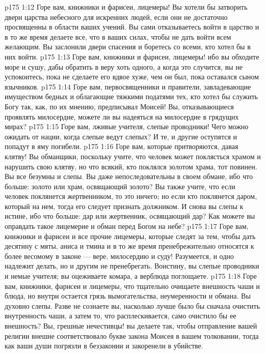 \vs p175 1:12 Горе вам, книжники и фарисеи, лицемеры! Вы хотели бы затворить двери царства небесного для искренних людей, если они не достаточно просвященны в области ваших учений. Вы сами отказываетесь войти в царство и в то же время делаете все, что в ваших силах, чтобы не дать войти всем желающим. Вы заслонили двери спасения и боретесь со всеми, кто хотел бы в них войти.
\vs p175 1:13 Горе вам, книжники и фарисеи, лицемеры! ибо вы обходите море и сушу, дабы обратить в веру хоть одного, а когда это случится, вы не успокоитесь, пока не сделаете его вдвое хуже, чем он был, пока оставался сыном язычников.
\vs p175 1:14 Горе вам, первосвященники и правители, завладевающие имуществом бедных и облагающие тяжкими податями тех, кто хотел бы служить Богу так, как, по их мнению, предписывал Моисей! Вы, отказывающиеся проявлять милосердие, можете ли вы надеяться на милосердие в грядущих мирах?
\vs p175 1:15 Горе вам, лживые учителя, слепые проводники! Чего можно ожидать от нации, когда слепые ведут слепых? И те, и другие оступятся и попадут в яму погибели.
\vs p175 1:16 Горе вам, которые притворяются, давая клятву! Вы обманщики, поскольку учите, что человек может поклясться храмом и нарушить свою клятву, но что всякий, кто поклялся золотом храма, тот повинен. Вы все безумны и слепы. Вы даже непоследовательны в своем обмане, ибо что больше: золото или храм, освящающий золото? Вы также учите, что если человек поклянется жертвенником, то это ничего; но если кто поклянется даром, который на нем, тогда его следует признать должником. И снова вы слепы к истине, ибо что больше: дар или жертвенник, освящающий дар? Как можете вы оправдать такое лицемерие и обман перед Богом на небе?
\vs p175 1:17 Горе вам, книжники и фарисеи и все прочие лицемеры, которые следят за тем, чтобы дать десятину с мяты, аниса и тмина и в то же время пренебрежительно относятся к более весомому в законе --- вере, милосердию и суду! Разумеется, и одно надлежит делать, но и другим не пренебрегать. Воистину, вы слепые проводники и немые учителя; вы оцеживаете комара, а верблюда поглощаете.
\vs p175 1:18 Горе вам, книжники, фарисеи и лицемеры, что тщательно очищаете внешность чаши и блюда, но внутри остается грязь вымогательства, неумеренности и обмана. Вы духовно слепы. Разве не сознаете вы, насколько лучше было бы сначала очистить внутренность чаши, а затем то, что расплескивается, само очистило бы ее внешность? Вы, грешные нечестивцы! вы делаете так, чтобы отправление вашей религии внешне соответствовало букве закона Моисея в вашем толковании, тогда как ваши души погрязли в беззаконии и закоренели в убийстве.
